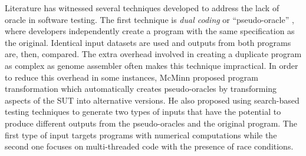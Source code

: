 Literature has witnessed several techniques developed to address the lack of oracle in software testing. The first technique is \emph{dual coding}
or ``pseudo-oracle'' \cite{weyuker1982testing}, where developers independently create a program with the same specification as
the original. Identical input datasets are used and outputs from both programs are, then, compared.
The extra overhead involved in creating a duplicate program as complex as genome assembler often makes this technique impractical.
In order to reduce this overhead in some instances,
McMinn \cite{McMinn:2009:SFD:1569901.1570127} proposed program transformation which automatically creates pseudo-oracles
by transforming aspects of the SUT into alternative versions. He also proposed using search-based
testing techniques to generate two types of inputs that have the potential to produce different outputs from the pseudo-oracles and the original program. The first type of input targets programs with numerical computations while the second one focuses on multi-threaded code with the presence of race conditions.

